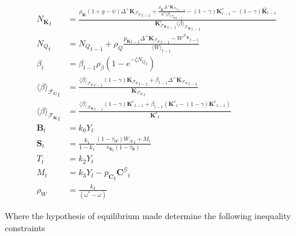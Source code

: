 \documentclass[a4paper, headings=standardclasses]{scrartcl}
\numberwithin{equation}{subsection}
\begin{document}
{\begin{align}
		{N_\mathbf{K}}_t & = \frac{\rho_\mathbf{K} (1 + g - \psi){\Delta^+\mathbf{K}_{\mathcal{F}_\mathbf{C}}}_{t-1} + \frac{\rho_\mathbf{K} {\Delta^+\mathbf{K}_{\mathcal{F}_\mathbf{C}}}_{t-1}}{u^* {\langle \beta \rangle_{\mathcal{F}_\mathbf{K}}}_{t-1}} - (1-\gamma) \mathbf{K}^e_{t-1} - (1-\gamma)\hat{\mathbf{K}}_{t-1}}{{\mathbf{K}_{\mathcal{F}_\mathbf{K}}^e}_{t-1} {\langle \beta \rangle_{\mathcal{F}_\mathbf{K}}}_{t-1}}\\
		{N_Q}_t & = {N_Q}_{t-1} + \rho_Q \frac{{p_\mathbf{K}}_{t-1} {\Delta^+ \mathbf{K}_{\mathcal{F}_\mathbf{C}}}_{t-1} - {W^{\mathcal{F}_\mathbf{K}}}_{t-1}}{\langle W \rangle_{t-1}}\\
		\beta_t & = \beta_{t-1} \rho_\beta (1-e^{-\zeta {N_Q}_t}) \\
		{\langle\beta\rangle_{\mathcal{F}_\mathbf{C}}}_{t} & =  \frac{{\langle\beta\rangle_{\mathcal{F}_\mathbf{C}}}_{t-1} (1 - \gamma) {\mathbf{K}_{\mathcal{F}_\mathbf{C}}}_{t-1} + \beta_{t-1} {\Delta^+ \mathbf{K}_{\mathcal{F}_\mathbf{C}}}_{t-1}}{{\mathbf{K}_{\mathcal{F}_\mathbf{C}}}_{t}} \\
		{\langle\beta\rangle_{\mathcal{F}_\mathbf{K}}}_{t} & = \frac{{\langle\beta\rangle_{\mathcal{F}_\mathbf{K}}}_{t-1} (1 - \gamma) {\mathbf{K}^e}_{t-1} + \beta_{t-1} ({\mathbf{K}^e}_{t} - (1 - \gamma) {\mathbf{K}^e}_{t-1})}{{\mathbf{K}^e}_{t}} \\
		\mathbf{B}_t &= k_0 Y_t \\
		\mathbf{S}_t &= \frac{k_1}{1-k_1} \frac{(1 - \tau_W) {W_\mathcal{H}}_t + M_t}{{r_\mathbf{S}}_t (1 - \tau_\mathbf{S})}\\
		T_t &= k_2 Y_t \\
		M_t &= k_3 Y_t - {p_\mathbf{C}}_t {\mathbf{C}^\mathcal{G}}_t\\
		\rho_W &= \frac{k_4}{(\omega^* - \omega)}	
	\end{align}
}

Where the hypothesis of equilibrium made determine the following inequality constraints
\end{document}
